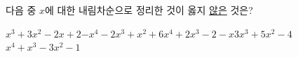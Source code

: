 다음 중 $x$에 대한 내림차순으로 정리한 것이 옳지 \underline{않은} 것은?
\begin{choicesii}{$x^3+3x^2-2x+2$}{$-x^4-2x^3+x^2+6$}{$x^4+2x^3-2-x$}{$3x^3+5x^2-4$}{$x^4+x^3-3x^2-1$}\end{choicesii}
